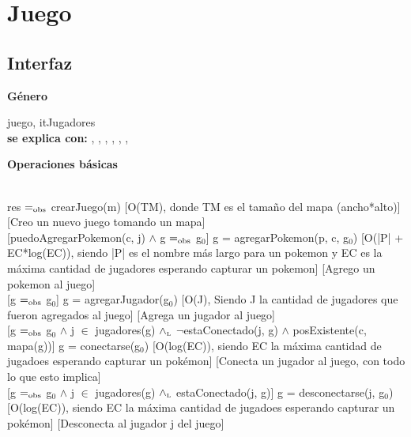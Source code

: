 \section{Juego}

\subsection{Interfaz}

\parbox {1,7cm}{{\bf Género}} juego, itJugadores \\
{\bf se explica con:}  ,  , , , , , \\
\medskip

\parbox {1,5cm}{\bf{Operaciones básicas}}\\

{res $=_{\mathrm{obs}}$ crearJuego(m)}
[O(TM), donde TM es el tamaño del mapa (ancho*alto)]
[Creo un nuevo juego tomando un mapa]\\

[puedoAgregarPokemon(c, j) $\wedge$ g $=_{\mathrm{obs}}$ g$_0$]
{g = agregarPokemon(p, c, g$_0$)}
[O(|P| + EC*log(EC)), siendo |P| es el nombre más largo para un pokemon y EC es la máxima cantidad de jugadores esperando capturar un pokemon]
[Agrego un pokemon al juego]\\

[g $=_{\mathrm{obs}}$ g$_0$]
{g = agregarJugador(g$_0$)}
[O(J), Siendo J la cantidad de jugadores que fueron agregados al juego]
[Agrega un jugador al juego]\\

[g $=_{\mathrm{obs}}$ g$_0$ $\wedge$ j $\in$ jugadores(g) $\land_{\mathrm{\scriptscriptstyle{L}}}$ $\neg$estaConectado(j, g) $\wedge$ posExistente(c, mapa(g))]
{g = conectarse(g$_0$)}
[O(log(EC)), siendo EC la máxima cantidad de jugadoes esperando capturar un pokémon]
[Conecta un jugador al juego, con todo lo que esto implica]\\

[g $=_{\mathrm{obs}}$ g$_0$ $\wedge$ j $\in$ jugadores(g) $\land_{\mathrm{\scriptscriptstyle{L}}}$ estaConectado(j, g)]
{g = desconectarse(j, g$_0$)}
[O(log(EC)), siendo EC la máxima cantidad de jugadoes esperando capturar un pokémon]
[Desconecta al jugador j del juego]\\


